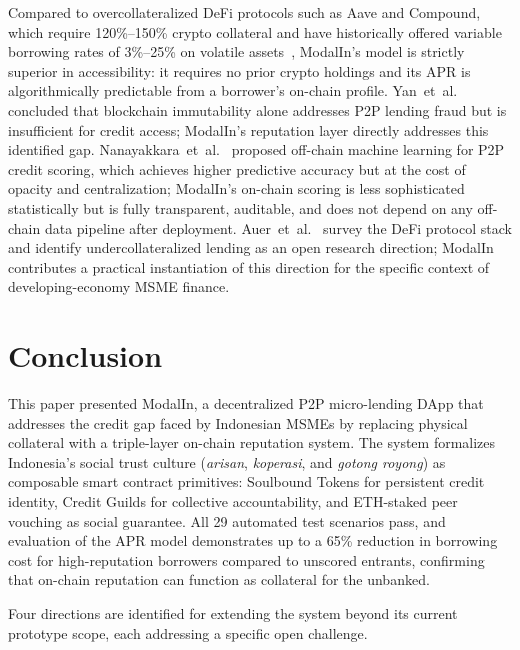\documentclass[conference]{IEEEtran}
\begin{document}
Compared to overcollateralized DeFi protocols such as Aave and Compound, which
require 120\%--150\% crypto collateral and have historically offered variable
borrowing rates of 3\%--25\% on volatile assets~\cite{b7}, ModalIn's model is
strictly superior in accessibility: it requires no prior crypto holdings and
its APR is algorithmically predictable from a borrower's on-chain
profile. Yan~et~al.~\cite{b7} concluded that blockchain immutability alone addresses
P2P lending fraud but is insufficient for credit access; ModalIn's reputation
layer directly addresses this identified gap. Nanayakkara~et~al.~\cite{b5}
proposed off-chain machine learning for P2P credit scoring, which achieves
higher predictive accuracy but at the cost of opacity and centralization;
ModalIn's on-chain scoring is less sophisticated statistically but is
fully transparent, auditable, and does not depend on any off-chain data
pipeline after deployment. Auer~et~al.~\cite{b20} survey the DeFi protocol
stack and identify undercollateralized lending as an open research direction;
ModalIn contributes a practical instantiation of this direction for the
specific context of developing-economy MSME finance.

\section{Conclusion}

This paper presented ModalIn, a decentralized P2P micro-lending DApp that
addresses the credit gap faced by Indonesian MSMEs by replacing physical
collateral with a triple-layer on-chain reputation system. The system
formalizes Indonesia's social trust culture (\textit{arisan},
\textit{koperasi}, and \textit{gotong royong}) as composable smart contract
primitives: Soulbound Tokens for persistent credit identity, Credit Guilds
for collective accountability, and ETH-staked peer vouching as social
guarantee. All 29 automated test scenarios pass, and evaluation of the APR
model demonstrates up to a 65\% reduction in borrowing cost for
high-reputation borrowers compared to unscored entrants, confirming that
on-chain reputation can function as collateral for the unbanked.

Four directions are identified for extending the system beyond its current
prototype scope, each addressing a specific open challenge.
\end{document}
